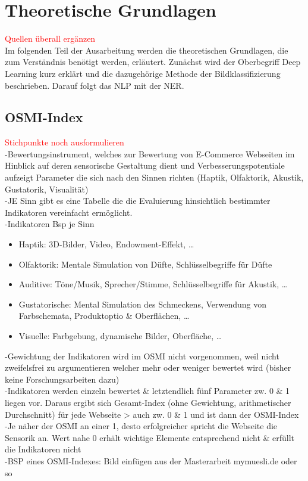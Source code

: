 \newpage
\section{Theoretische Grundlagen}
\textcolor{red}{Quellen überall ergänzen} \\
Im folgenden Teil der Ausarbeitung werden die theoretischen Grundlagen, die zum Verständnis benötigt werden, erläutert.
Zunächst wird der Oberbegriff Deep Learning kurz erklärt und die dazugehörige Methode der Bildklassifizierung beschrieben. Darauf folgt das \ac{NLP} mit der \ac{NER}.

\subsection{OSMI-Index}

\textcolor{red}{Stichpunkte noch ausformulieren} \\

-Bewertungsinstrument, welches zur Bewertung von E-Commerce Webseiten im Hinblick auf
deren sensorische Gestaltung dient und Verbesserungspotentiale aufzeigt
Parameter die sich nach den Sinnen richten (Haptik, Olfaktorik, Akustik, Gustatorik,
Visualität) \\
-JE Sinn gibt es eine Tabelle die die Evaluierung hinsichtlich bestimmter Indikatoren
vereinfacht ermöglicht. \\
-Indikatoren Bsp je Sinn\\
\begin{itemize}
    \item Haptik: 3D-Bilder, Video, Endowment-Effekt, …
    \item Olfaktorik: Mentale Simulation von Düfte, Schlüsselbegriffe für Düfte
    \item Auditive: Töne/Musik, Sprecher/Stimme, Schlüsselbegriffe für Akustik, …
    \item Gustatorische: Mental Simulation des Schmeckens, Verwendung von
    Farbschemata, Produktoptio \& Oberflächen, …
    \item Visuelle: Farbgebung, dynamische Bilder, Oberfläche, …
\end{itemize}

-Gewichtung der Indikatoren wird im \ac{OSMI} nicht vorgenommen, weil nicht zweifelsfrei zu
argumentieren welcher mehr oder weniger bewertet wird (bisher keine Forschungsarbeiten
dazu) \\
-Indikatoren werden einzeln bewertet \& letztendlich fünf Parameter zw. 0 \& 1 liegen vor.
Daraus ergibt sich Gesamt-Index (ohne Gewichtung, arithmetischer Durchschnitt) für jede
Webseite > auch zw. 0 \& 1 und ist dann der \ac{OSMI}-Index \\
-Je näher der \ac{OSMI} an einer 1, desto erfolgreicher spricht die Webseite die Sensorik an. Wert
nahe 0 erhält wichtige Elemente entsprechend nicht \& erfüllt die Indikatoren nicht \\
-BSP eines \ac{OSMI}-Indexes: Bild einfügen aus der Masterarbeit mymuesli.de oder so



